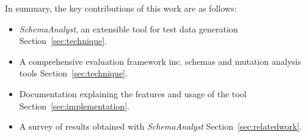 In summary, the key contributions of this work are as follows:

\begin{itemize}
\item \textit{SchemaAnalyst}, an extensible tool for test data generation Section~\ref{sec:technique}.
\item A comprehensive evaluation framework inc. schemas and mutation analysis tools Section~\ref{sec:technique}.
\item Documentation explaining the features and usage of the tool Section~\ref{sec:implementation}.
\item A survey of results obtained with \textit{SchemaAnalyst} Section~\ref{sec:relatedwork}.
\end{itemize}

